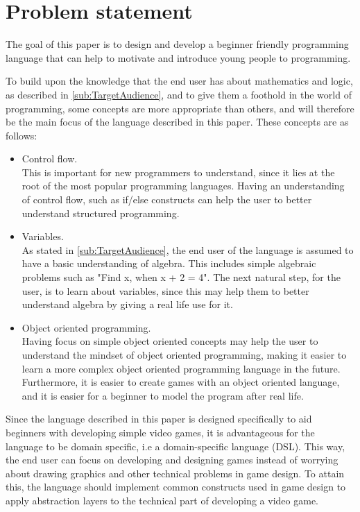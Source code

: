 \newpage
\section{Problem statement}
\label{sec:problemstatement}
The goal of this paper is to design and develop a beginner friendly programming language that can help to motivate and introduce young people to programming.

To build upon the knowledge that the end user has about mathematics and logic, as described in \ref{sub:TargetAudience}, and to give them a foothold in the world of programming, some concepts are more appropriate than others, and will therefore be the main focus of the language described in this paper. These concepts are as follows:

\begin{itemize}
    \item Control flow.\\
    This is important for new programmers to understand, since it lies at the root of the most popular programming languages. Having an understanding of control flow, such as if/else constructs can help the user to better understand structured programming.
    
    \item Variables.\\
    As stated in \ref{sub:TargetAudience}, the end user of the language is assumed to have a basic understanding of algebra. This includes simple algebraic problems such as "Find x, when x + 2 = 4". The next natural step, for the user, is to learn about variables, since this may help them to better understand algebra by giving a real life use for it.
    
    \item Object oriented programming.\\
    Having focus on simple object oriented concepts may help the user to understand the mindset of object oriented programming, making it easier to learn a more complex object oriented programming language in the future.
    Furthermore, it is easier to create games with an object oriented language, and it is easier for a beginner to model the program after real life.
\end{itemize}


Since the language described in this paper is designed specifically to aid beginners with developing simple video games, it is advantageous for the language to be domain specific, i.e a domain-specific language (DSL). This way, the end user can focus on developing and designing games instead of worrying about drawing graphics and other technical problems in game design. To attain this, the language should implement common constructs used in game design to apply abstraction layers to the technical part of developing a video game.

